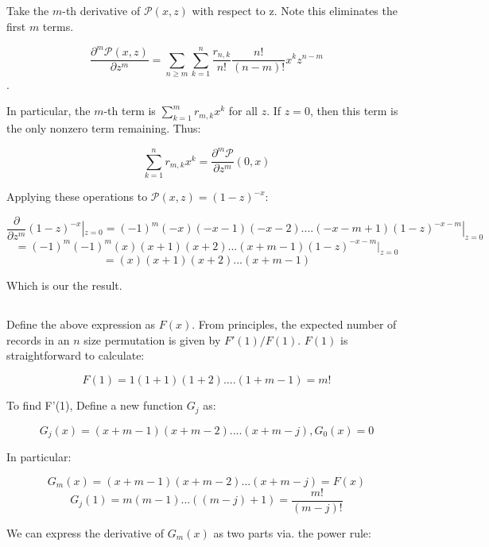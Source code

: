 \documentclass{article}
\begin{document}
\subsection{}

\subsection{}

\subsection{}
Take the $m$-th derivative of $\mathcal P(x,z)$ with respect to z. Note this eliminates the first $m$ terms.

$$\frac{\partial^m \mathcal P(x,z)}{\partial z^m} = \sum_{n \ge m} \sum_{k = 1}^{n} \frac{r_{n,k}}{n!}\frac{n!}{(n-m)!}x^kz^{n-m}$$. 

In particular, the $m$-th term is $\sum_{k = 1}^{m}r_{m,k} x^k$ for all $z$. If $z = 0$, then this term is the only nonzero term remaining. Thus:

$$\sum_{k = 1}^{n}r_{m,k} x^k = \frac{\partial^m \mathcal P}{\partial z^m}(0,x) $$

Applying these operations to $\mathcal P(x,z) = (1-z)^{-x}$:

$$\frac{\partial}{\partial z^m} (1-z)^{-x}|_{z = 0} = (-1)^m(-x)(-x-1)(-x-2)....(-x - m + 1)(1-z)^{-x-m}|_{z = 0}$$
$$= (-1)^m(-1)^m(x)(x+1)(x+2)...(x + m -1)(1-z)^{-x-m}|_{z = 0}$$
$$= (x)(x+1)(x+2)...(x + m -1)$$

Which is our the result.

\subsection{}

Define the above expression as $F(x)$. From principles, the expected number of records in an $n$ size permutation is given by $F'(1)/F(1)$. $F(1)$ is straightforward to calculate:

$$F(1) = 1(1+1)(1 + 2)....(1 + m - 1) = m!$$

To find F'(1), Define a new function $G_j$ as:

$$G_j(x) = (x+m-1)(x+m-2)....(x+m-j), G_0(x) = 0$$

In particular:

$$G_m(x) = (x+m-1)(x+m-2)...(x+m-j) = F(x)$$ 
$$G_j(1) = m(m-1)...( (m-j)+1) = \frac{m!}{(m-j)!}$$

We can express the derivative of $G_m(x)$ as two parts via. the power rule:
\end{document}
